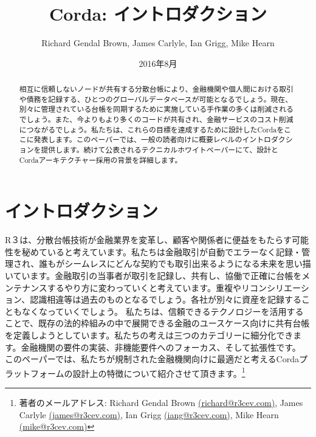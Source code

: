 \documentclass{article}
\author{Richard Gendal Brown, James Carlyle, Ian Grigg, Mike Hearn}
\date{2016年8月}
\title{Corda:  イントロダクション}
\begin{document}
\maketitle
\begin{abstract}
相互に信頼しないノードが共有する分散台帳により、金融機関や個人間における取引や債務を記録する、ひとつのグローバルデータベースが可能となるでしょう。現在、別々に管理されている台帳を同期するために実施している手作業の多くは削減されるでしょう。また、今よりもより多くのコードが共有され、金融サービスのコスト削減につながるでしょう。私たちは、これらの目標を達成するために設計したCordaをここに発表します。このペーパーでは、一般の読者向けに概要レベルのイントロダクションを提供します。続けて公表されるテクニカルホワイトペーパーにて、設計とCordaアーキテクチャー採用の背景を詳細します。
\end{abstract}
\newpage
\tableofcontents
\newpage
\section{イントロダクション}
R３は、分散台帳技術が金融業界を変革し、顧客や関係者に便益をもたらす可能性を秘めていると考えています。私たちは金融取引が自動でエラーなく記録・管理され、誰もがシームレスにどんな契約でも取引出来るようになる未来を思い描いています。金融取引の当事者が取引を記録し、共有し、協働で正確に台帳をメンテナンスするやり方に変わっていくと考えています。重複やリコンシリエーション、認識相違等は過去のものとなるでしょう。各社が別々に資産を記録することもなくなっていくでしょう。
私たちは、信頼できるテクノロジーを活用することで、既存の法的枠組みの中で展開できる金融のユースケース向けに共有台帳を定義しようとしています。私たちの考えは三つのカテゴリーに細分化できます。金融機関の要件の実装、非機能要件へのフォーカス、そして拡張性です。
このペーパーでは、私たちが規制された金融機関向けに最適だと考えるCordaプラットフォームの設計上の特徴について紹介させて頂きます。\footnote{著者のメールアドレス: Richard Gendal Brown \href{mailto:richard@r3cev.com}{(richard@r3cev.com)}, James Carlyle \href{mailto:james@r3cev.com}{(james@r3cev.com)}, Ian Grigg \href{mailto:iang@r3cev.com}{(iang@r3cev.com)}, Mike Hearn \href{mailto:mike@r3cev.com}{(mike@r3cev.com)}}
\end{document}
